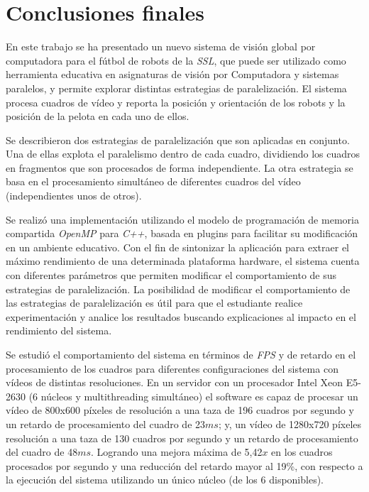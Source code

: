 
\section{Conclusiones finales}

\label{concluciones}

En este trabajo se ha presentado un nuevo sistema de visión global por
computadora para el fútbol de robots de la \emph{SSL}, que puede ser utilizado
como herramienta educativa en asignaturas de visión por Computadora y sistemas
paralelos, y permite explorar distintas estrategias de paralelización. El
sistema procesa cuadros de vídeo y reporta la posición y orientación de los
robots y la posición de la pelota en cada uno de ellos.

Se describieron dos estrategias de paralelización que son aplicadas en conjunto.
Una de ellas explota el paralelismo dentro de cada cuadro, dividiendo los
cuadros en fragmentos que son procesados de forma independiente. La otra
estrategia se basa en el procesamiento simultáneo de diferentes cuadros del
vídeo (independientes unos de otros).

Se realizó una implementación utilizando el modelo de programación de memoria
compartida \emph{OpenMP} para \emph{C++}, basada en plugins para facilitar su
modificación en un ambiente educativo. Con el fin de sintonizar la aplicación
para extraer el máximo rendimiento de una determinada plataforma hardware, el
sistema cuenta con diferentes parámetros que permiten modificar el
comportamiento de sus estrategias de paralelización. La posibilidad de modificar
el comportamiento de las estrategias de paralelización es útil para que el
estudiante realice experimentación y analice los resultados buscando
explicaciones al impacto en el rendimiento del sistema.

Se estudió el comportamiento del sistema en términos de \emph{FPS} y de retardo
en el procesamiento de los cuadros para diferentes configuraciones del sistema
con vídeos de distintas resoluciones. En un servidor con un procesador Intel
Xeon E5-2630 (6 núcleos y multithreading simultáneo) el software es capaz de
procesar un vídeo de 800x600 píxeles de resolución a una taza de 196 cuadros por
segundo y un retardo de procesamiento del cuadro de 23$ms$; y, un vídeo de
1280x720 píxeles resolución a una taza de 130 cuadros por segundo y un retardo
de procesamiento del cuadro de 48$ms$. Logrando una mejora máxima de 5,42$x$ en
los cuadros procesados por segundo y una reducción del retardo mayor al 19\%,
con respecto a la ejecución del sistema utilizando un único núcleo (de los 6
disponibles).

